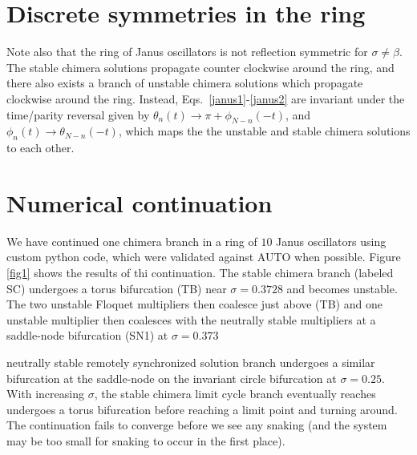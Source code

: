 \documentclass[aps,pre,amsmath,amssymb,floatfix,onecolumn,notitlepage,10pt]{revtex4-1}
\begin{document}
\section{Discrete symmetries in the ring}
Note also that the ring of Janus oscillators is not reflection symmetric for $\sigma \neq \beta$. The stable chimera solutions propagate counter clockwise around the ring, and there also exists a branch of unstable chimera solutions which propagate clockwise around the ring. Instead, Eqs.~\eqref{janus1}-\eqref{janus2}  are invariant under the time/parity reversal given by $\theta_n(t)\to \pi+\phi_{N-n}(-t)$, and $\phi_n(t)\to \theta_{N-n}(-t)$, which maps the the unstable and stable chimera solutions to each other.


\section{Numerical continuation}
We have continued one chimera branch in a ring of $10$ Janus oscillators using custom python code, which were validated against AUTO when possible. Figure \ref{fig1} shows the results of thi continuation. The stable chimera branch (labeled SC) undergoes a torus bifurcation (TB) near $\sigma = 0.3728$ and becomes unstable. The two unstable Floquet multipliers then coalesce just above (TB) and one unstable multiplier then coalesces with the neutrally stable multipliers at a saddle-node bifurcation (SN1) at $\sigma =0.373$


 neutrally stable remotely synchronized solution branch undergoes a similar bifurcation at the saddle-node on the invariant circle bifurcation at $\sigma=0.25$.  With increasing $\sigma$, the stable chimera limit cycle branch eventually reaches undergoes a torus bifurcation before reaching a limit point and turning around. The continuation fails to converge before we see any snaking (and the system may be too small for snaking to occur in the first place).
\end{document}

